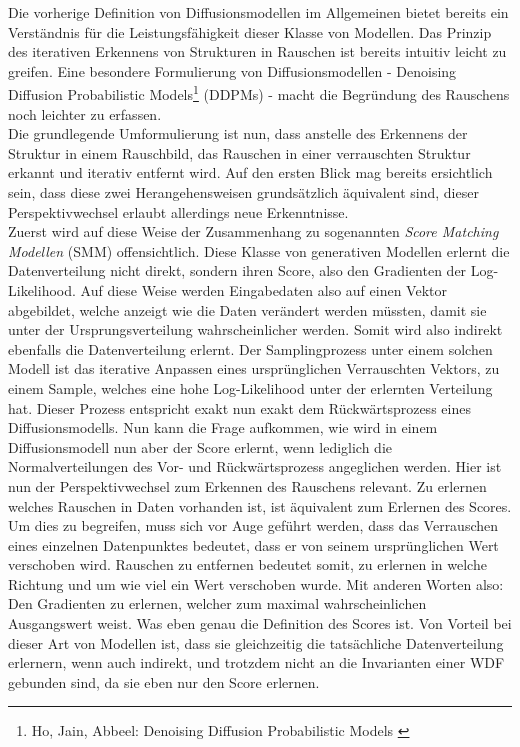 Die vorherige Definition von Diffusionsmodellen im Allgemeinen bietet bereits ein Verständnis für die Leistungsfähigkeit dieser Klasse von Modellen. Das Prinzip des iterativen Erkennens von Strukturen in Rauschen ist bereits intuitiv leicht zu greifen. Eine besondere Formulierung von Diffusionsmodellen - Denoising Diffusion Probabilistic Models\footnote{
    Ho, Jain, Abbeel: Denoising Diffusion Probabilistic Models
    \cite{ho2020denoisingdiffusionprobabilisticmodels}
} (DDPMs) - macht die Begründung des Rauschens noch leichter zu erfassen. \\
Die grundlegende Umformulierung ist nun, dass anstelle des Erkennens der Struktur in einem Rauschbild, das Rauschen in einer verrauschten Struktur erkannt und iterativ entfernt wird. Auf den ersten Blick mag bereits ersichtlich sein, dass diese zwei Herangehensweisen grundsätzlich äquivalent sind, dieser Perspektivwechsel erlaubt allerdings neue Erkenntnisse. \\
Zuerst wird auf diese Weise der Zusammenhang zu sogenannten \textit{Score Matching Modellen} (SMM) offensichtlich. Diese Klasse von generativen Modellen erlernt die Datenverteilung nicht direkt, sondern ihren Score, also den Gradienten der Log-Likelihood. Auf diese Weise werden Eingabedaten also auf einen Vektor abgebildet, welche anzeigt wie die Daten verändert werden müssten, damit sie unter der Ursprungsverteilung wahrscheinlicher werden. Somit wird also indirekt ebenfalls die Datenverteilung erlernt. Der Samplingprozess unter einem solchen Modell ist das iterative Anpassen eines ursprünglichen Verrauschten Vektors, zu einem Sample, welches eine hohe Log-Likelihood unter der erlernten Verteilung hat. Dieser Prozess entspricht exakt nun exakt dem Rückwärtsprozess eines Diffusionsmodells. Nun kann die Frage aufkommen, wie wird in einem Diffusionsmodell nun aber der Score erlernt, wenn lediglich die Normalverteilungen des Vor- und Rückwärtsprozess angeglichen werden. Hier ist nun der Perspektivwechsel zum Erkennen des Rauschens relevant. Zu erlernen welches Rauschen in Daten vorhanden ist, ist äquivalent zum Erlernen des Scores. Um dies zu begreifen, muss sich vor Auge geführt werden, dass das Verrauschen eines einzelnen Datenpunktes bedeutet, dass er von seinem ursprünglichen Wert verschoben wird. Rauschen zu entfernen bedeutet somit, zu erlernen in welche Richtung und um wie viel ein Wert verschoben wurde. Mit anderen Worten also: Den Gradienten zu erlernen, welcher zum maximal wahrscheinlichen Ausgangswert weist. Was eben genau die Definition des Scores ist. Von Vorteil bei dieser Art von Modellen ist, dass sie gleichzeitig die tatsächliche Datenverteilung erlernern, wenn auch indirekt, und trotzdem nicht an die Invarianten einer WDF gebunden sind, da sie eben nur den Score erlernen. \\
